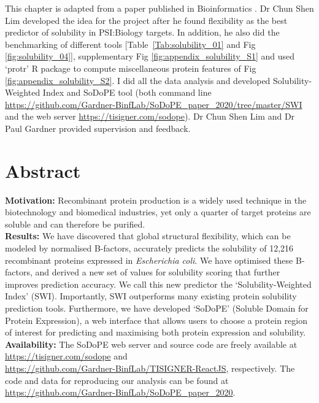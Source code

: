 This chapter is adapted from a paper published in Bioinformatics \cite{Bhandari2020-pz}. Dr Chun Shen Lim developed the idea for the project after he found flexibility as the best predictor of solubility in PSI:Biology targets. In addition, he also did the benchmarking of different tools  [Table~\ref{Tab:solubility_01} and Fig \ref{fig:solubility_04}], supplementary Fig \ref{fig:appendix_solubility_S1} and used ‘protr’ R package to compute miscellaneous protein features of Fig \ref{fig:appendix_solubility_S2}. I did all the data analysis and developed Solubility-Weighted Index and SoDoPE tool (both command line \href{https://github.com/Gardner-BinfLab/SoDoPE\_paper\_2020/tree/master/SWI}{https://github.com/Gardner-BinfLab/SoDoPE\_paper\_2020/tree/master/SWI} and the web server \href{https://tisigner.com/sodope}{https://tisigner.com/sodope}). Dr Chun Shen Lim and Dr Paul Gardner provided supervision and feedback.


\section{Abstract}
\textbf{Motivation:} Recombinant protein production is a widely used technique in the biotechnology and biomedical industries, yet only a quarter of target proteins are soluble and can therefore be purified.\\
\textbf{Results:} We have discovered that global structural flexibility, which can be modeled by normalised B-factors, accurately predicts the solubility of 12,216 recombinant proteins expressed in \textit{Escherichia coli}. We have optimised these B-factors, and derived a new set of values for solubility scoring that further improves prediction accuracy. We call this new predictor the ‘Solubility-Weighted Index’ (SWI). Importantly, SWI outperforms many existing protein solubility prediction tools. Furthermore, we have developed ‘SoDoPE’ (Soluble Domain for Protein Expression), a web interface that allows users to choose a protein region of interest for predicting and maximising both protein expression and solubility.\\
\textbf{Availability:} The SoDoPE web server and source code are freely available at\\ \href{https://tisigner.com/sodope}{https://tisigner.com/sodope} and \\ \href{https://github.com/Gardner-BinfLab/TISIGNER-ReactJS}{https://github.com/Gardner-BinfLab/TISIGNER-ReactJS}, respectively.
The code and data for reproducing our analysis can be found at\\ \href{https://github.com/Gardner-BinfLab/SoDoPE\_paper\_2020}{https://github.com/Gardner-BinfLab/SoDoPE\_paper\_2020}.\\



